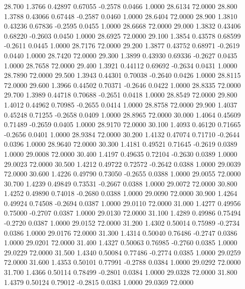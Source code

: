   28.700   1.3766   0.42897   0.67055  -0.2578   0.0466   1.0000  28.6134  72.0000
  28.800   1.3788   0.43066   0.67448  -0.2587   0.0460   1.0000  28.6404  72.0000
  28.900   1.3810   0.43236   0.67836  -0.2595   0.0455   1.0000  28.6668  72.0000
  29.000   1.3832   0.43406   0.68220  -0.2603   0.0450   1.0000  28.6925  72.0000
  29.100   1.3854   0.43578   0.68599  -0.2611   0.0445   1.0000  28.7176  72.0000
  29.200   1.3877   0.43752   0.68971  -0.2619   0.0440   1.0000  28.7420  72.0000
  29.300   1.3899   0.43930   0.69336  -0.2627   0.0435   1.0000  28.7658  72.0000
  29.400   1.3921   0.44112   0.69692  -0.2634   0.0431   1.0000  28.7890  72.0000
  29.500   1.3943   0.44301   0.70038  -0.2640   0.0426   1.0000  28.8115  72.0000
  29.600   1.3966   0.44502   0.70371  -0.2646   0.0422   1.0000  28.8335  72.0000
  29.700   1.3989   0.44718   0.70688  -0.2651   0.0418   1.0000  28.8549  72.0000
  29.800   1.4012   0.44962   0.70985  -0.2655   0.0414   1.0000  28.8758  72.0000
  29.900   1.4037   0.45248   0.71255  -0.2658   0.0409   1.0000  28.8965  72.0000
  30.000   1.4064   0.45609   0.71489  -0.2659   0.0405   1.0000  28.9170  72.0000
  30.100   1.4093   0.46120   0.71665  -0.2656   0.0401   1.0000  28.9384  72.0000
  30.200   1.4132   0.47074   0.71710  -0.2644   0.0396   1.0000  28.9640  72.0000
  30.300   1.4181   0.49521   0.71645  -0.2619   0.0389   1.0000  29.0008  72.0000
  30.400   1.4197   0.49635   0.72104  -0.2630   0.0389   1.0000  29.0023  72.0000
  30.500   1.4212   0.49722   0.72572  -0.2642   0.0388   1.0000  29.0039  72.0000
  30.600   1.4226   0.49790   0.73050  -0.2655   0.0388   1.0000  29.0055  72.0000
  30.700   1.4239   0.49849   0.73531  -0.2667   0.0388   1.0000  29.0072  72.0000
  30.800   1.4252   0.49890   0.74018  -0.2680   0.0388   1.0000  29.0090  72.0000
  30.900   1.4264   0.49924   0.74508  -0.2694   0.0387   1.0000  29.0110  72.0000
  31.000   1.4277   0.49956   0.75000  -0.2707   0.0387   1.0000  29.0130  72.0000
  31.100   1.4289   0.49986   0.75494  -0.2720   0.0387   1.0000  29.0152  72.0000
  31.200   1.4302   0.50014   0.75989  -0.2734   0.0386   1.0000  29.0176  72.0000
  31.300   1.4314   0.50040   0.76486  -0.2747   0.0386   1.0000  29.0201  72.0000
  31.400   1.4327   0.50063   0.76985  -0.2760   0.0385   1.0000  29.0229  72.0000
  31.500   1.4340   0.50084   0.77486  -0.2774   0.0385   1.0000  29.0259  72.0000
  31.600   1.4353   0.50101   0.77991  -0.2788   0.0384   1.0000  29.0292  72.0000
  31.700   1.4366   0.50114   0.78499  -0.2801   0.0384   1.0000  29.0328  72.0000
  31.800   1.4379   0.50124   0.79012  -0.2815   0.0383   1.0000  29.0369  72.0000

